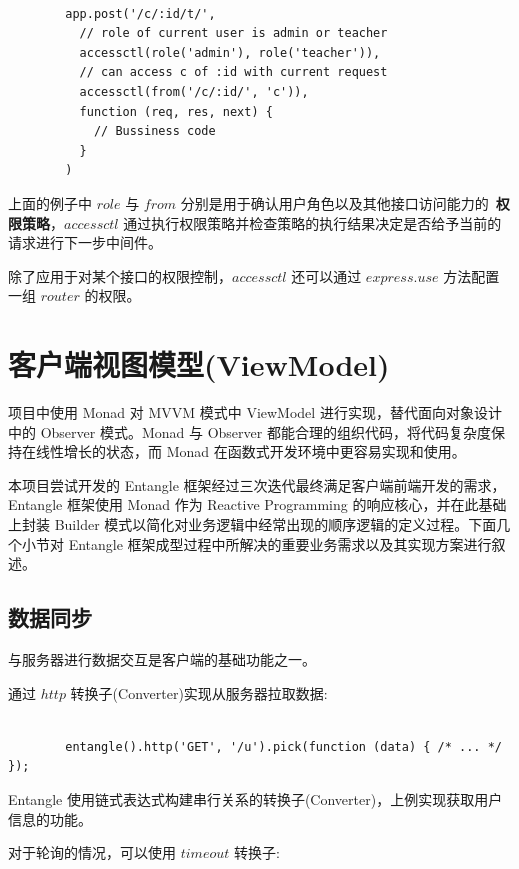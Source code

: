 \begin{verbatim}

        app.post('/c/:id/t/',
          // role of current user is admin or teacher
          accessctl(role('admin'), role('teacher')),
          // can access c of :id with current request
          accessctl(from('/c/:id/', 'c')),
          function (req, res, next) {
            // Bussiness code
          }
        )

\end{verbatim}

上面的例子中 $role$ 与 $from$ 分别是用于确认用户角色以及其他接口访问能力的~\textbf{权限策略}，$accessctl$ 通过执行权限策略并检查策略的执行结果决定是否给予当前的请求进行下一步中间件。

除了应用于对某个接口的权限控制，$accessctl$ 还可以通过 $express.use$ 方法配置一组 $router$ 的权限。

\section{客户端视图模型(ViewModel)}

项目中使用 Monad 对 MVVM 模式中 ViewModel 进行实现，替代面向对象设计中的 Observer 模式。Monad 与 Observer 都能合理的组织代码，将代码复杂度保持在线性增长的状态，而 Monad 在函数式开发环境中更容易实现和使用。

本项目尝试开发的 Entangle 框架经过三次迭代最终满足客户端前端开发的需求，Entangle 框架使用 Monad 作为 Reactive Programming 的响应核心，并在此基础上封装 Builder 模式以简化对业务逻辑中经常出现的顺序逻辑的定义过程。下面几个小节对 Entangle 框架成型过程中所解决的重要业务需求以及其实现方案进行叙述。

\subsection{数据同步}

与服务器进行数据交互是客户端的基础功能之一。

通过 $http$ 转换子(Converter)实现从服务器拉取数据:

\begin{verbatim}

        entangle().http('GET', '/u').pick(function (data) { /* ... */ });

\end{verbatim}

Entangle 使用链式表达式构建串行关系的转换子(Converter)，上例实现获取用户信息的功能。

对于轮询的情况，可以使用 $timeout$ 转换子:

